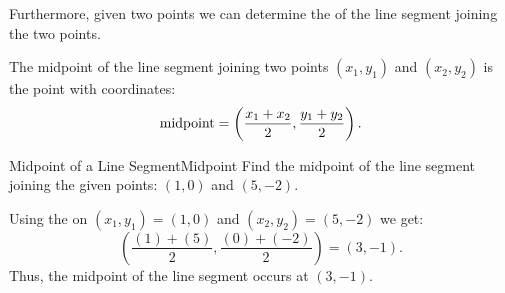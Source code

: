 Furthermore, given two points we can determine the  of the line segment joining the two points.\\

\begin{formulabox}
The midpoint of the line segment joining two points $(x_1,y_1)$ and 
$(x_2,y_2)$ is the point with coordinates:
$$\hbox{midpoint}=\left(\frac{x_1+x_2}{2},\frac{y_1+y_2}{2}\right).$$
\end{formulabox}

\bigskip

\begin{example}{Midpoint of a Line Segment}{Midpoint}
Find the midpoint of the line segment joining the given points: $(1,0)$ and $(5,-2)$.
\end{example}

\begin{solution} 
Using the  on $(x_1,y_1)=(1,0)$ and $(x_2,y_2)=(5,-2)$ we get:
$$\left(\frac{(1)+(5)}{2},\frac{(0)+(-2)}{2}\right)=(3,-1).$$
Thus, the midpoint of the line segment occurs at $(3,-1)$.
\end{solution}

